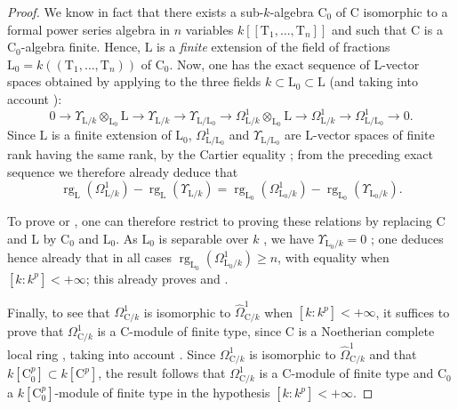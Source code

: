 \begin{proof}
We know in fact  that there exists a sub-$k$-algebra $\mathrm{C}_0$ of $\mathrm{C}$ isomorphic to a formal power series algebra in $n$ variables $k[[\mathrm{T}_1,\ldots,\mathrm{T}_n]]$ and such that $\mathrm{C}$ is a $\mathrm{C}_0$-algebra finite.
Hence, $\mathrm{L}$ is a \emph{finite} extension of the field of fractions $\mathrm{L}_0=k((\mathrm{T}_1,\ldots,\mathrm{T}_n))$ of $\mathrm{C}_0$.
Now, one has the exact sequence of $\mathrm{L}$-vector spaces obtained by applying  to the three fields $k\subset\mathrm{L}_0\subset\mathrm{L}$ (and taking into account ):
\[
  0\to\Upsilon_{\mathrm{L}/k}\otimes_{\mathrm{L}_0}\mathrm{L}\to\Upsilon_{\mathrm{L}/k}\to\Upsilon_{\mathrm{L}/\mathrm{L}_0}\to\Omega^1_{\mathrm{L}/k}\otimes_{\mathrm{L}_0}\mathrm{L}\to\Omega^1_{\mathrm{L}/k}\to\Omega^1_{\mathrm{L}/\mathrm{L}_0}\to 0.
\]
Since $\mathrm{L}$ is a finite extension of $\mathrm{L}_0$, $\Omega^1_{\mathrm{L}/\mathrm{L}_0}$ and $\Upsilon_{\mathrm{L}/\mathrm{L}_0}$ are $\mathrm{L}$-vector spaces of finite rank having the same rank, by the Cartier equality ; from the preceding exact sequence we therefore already deduce that
\[
  \operatorname{rg}_{\mathrm{L}}(\Omega^1_{\mathrm{L}/k})-\operatorname{rg}_{\mathrm{L}}(\Upsilon_{\mathrm{L}/k})=\operatorname{rg}_{\mathrm{L}_0}(\Omega^1_{\mathrm{L}_0/k})-\operatorname{rg}_{\mathrm{L}_0}(\Upsilon_{\mathrm{L}_0/k}).
\]

To prove  or , one can therefore restrict to proving these relations by replacing $\mathrm{C}$ and $\mathrm{L}$ by $\mathrm{C}_0$ and $\mathrm{L}_0$.
As $\mathrm{L}_0$ is separable over $k$ , we have $\Upsilon_{\mathrm{L}_0/k}=0$ ; one deduces hence already that in all cases $\operatorname{rg}_{\mathrm{L}_0}(\Omega^1_{\mathrm{L}_0/k})\geq n$, with equality when $[k:k^p]<+\infty$; this already proves  and .

Finally, to see that $\Omega^1_{\mathrm{C}/k}$ is isomorphic to $\hat{\Omega}^1_{\mathrm{C}/k}$ when $[k:k^p]<+\infty$, it suffices to prove that $\Omega^1_{\mathrm{C}/k}$ is a $\mathrm{C}$-module of finite type, since $\mathrm{C}$ is a Noetherian complete local ring , taking into account .
Since $\Omega^1_{\mathrm{C}/k}$ is isomorphic to $\hat{\Omega}^1_{\mathrm{C}/k}$ and that $k[\mathrm{C}_0^p]\subset k[\mathrm{C}^p]$, the result follows that $\Omega^1_{\mathrm{C}/k}$ is a $\mathrm{C}$-module of finite type and $\mathrm{C}_0$ a $k[\mathrm{C}_0^p]$-module of finite type in the hypothesis $[k:k^p]<+\infty$.
\end{proof}


